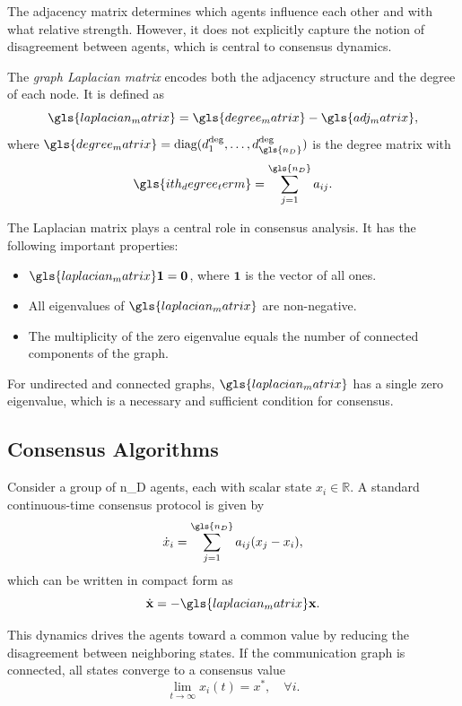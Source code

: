The adjacency matrix determines which agents influence each other and with what relative strength.
However, it does not explicitly capture the notion of disagreement between agents, which is central to consensus dynamics.

The \textit{graph Laplacian matrix} encodes both the adjacency structure and the degree of each node.
It is defined as
\begin{equation}
    \gls{laplacian_matrix} = \gls{degree_matrix} - \gls{adj_matrix},
\end{equation}
where $\gls{degree_matrix} = \text{diag}(d^{\mathrm{deg}}_1, \dots, d^{\mathrm{deg}}_{\gls{n_D}})$ is the degree matrix with
\begin{equation}
    \gls{ith_degree_term} = \sum_{j=1}^{\gls{n_D}} a_{ij}.
\end{equation}

The Laplacian matrix plays a central role in consensus analysis.
It has the following important properties:
\begin{itemize}
    \item $\gls{laplacian_matrix}\mathbf{1} = \mathbf{0}$, where $\mathbf{1}$ is the vector of all ones.
    \item All eigenvalues of $\gls{laplacian_matrix}$ are non-negative.
    \item The multiplicity of the zero eigenvalue equals the number of connected components of the graph.
\end{itemize}

For undirected and connected graphs, $\gls{laplacian_matrix}$ has a single zero eigenvalue, which is a necessary and sufficient condition for consensus.

\subsection{Consensus Algorithms}

Consider a group of \gls{n_D} agents, each with scalar state $x_i \in \mathbb{R}$.
A standard continuous-time consensus protocol is given by
\begin{equation}
    \dot{x}_i = \sum_{j=1}^{\gls{n_D}} a_{ij} (x_j - x_i),
\end{equation}
which can be written in compact form as
\begin{equation}
    \dot{\mathbf{x}} = -\gls{laplacian_matrix}\mathbf{x}.
\end{equation}

This dynamics drives the agents toward a common value by reducing the disagreement between neighboring states.
If the communication graph is connected, all states converge to a consensus value
\begin{equation}
    \lim_{t \to \infty} x_i(t) = x^\ast, \quad \forall i.
\end{equation}

